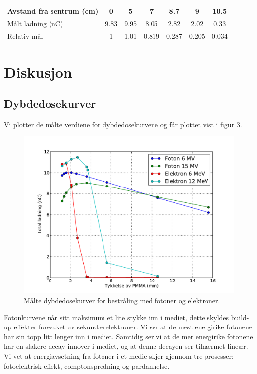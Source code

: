 \documentclass[a4paper, 11pt, notitlepage]{article}
\begin{document}
\begin{center}
\begin{tabular}{|l|c|c|c|c|c|c|}
\hline
Avstand fra sentrum (cm) & 0 & 5 & 7 & 8.7 & 9 & 10.5 \\ \hline
Målt ladning (nC) & 9.83 & 9.95 & 8.05 & 2.82 & 2.02 & 0.33 \\ \hline
Relativ mål & 1 & 1.01 & 0.819 & 0.287 & 0.205 & 0.034 \\ \hline
\end{tabular}
\end{center}

\section{Diskusjon}
\subsection{Dybdedosekurver}
Vi plotter de målte verdiene for dybdedosekurvene og får plottet vist i figur 3.

\begin{figure}[htpb]
 \centering
 \includegraphics[width=\textwidth]{dybdedose}
 \caption{Målte dybdedosekurver for bestråling med fotoner og elektroner.}
\end{figure}

Fotonkurvene når sitt maksimum et lite stykke inn i mediet, dette skyldes build-up effekter foresaket av sekundærelektroner. Vi ser at de mest energirike fotonene har sin topp litt lenger inn i mediet. Samtidig ser vi at de mer energirike fotonene har en slakere decay innover i mediet, og at denne decayen ser tilnærmet lineær. Vi vet at energiavsetning fra fotoner i et medie skjer gjennom tre prosesser: fotoelektrisk effekt, comptonspredning og pardannelse.
\end{document}
